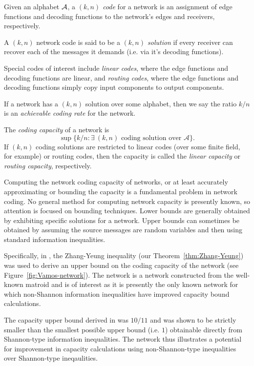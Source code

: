 \documentclass[10pt,journal]{IEEEtran}
\begin{document}
Given an alphabet $\mathcal{A}$,
a \textit{$(k,n)$ code}
for a network
is an assignment of edge functions and decoding functions
to the network's edges and receivers, respectively.
%

A $(k,n)$ network code is said to be a \textit{$(k,n)$ solution} if every receiver can recover
each of the messages it demands
(i.e. via it's decoding functions).

Special codes of interest include \textit{linear codes},
where the edge functions and decoding functions are linear,
and \textit{routing codes},
where the edge functions and decoding functions simply copy input components to output components.

If a network has a $(k,n)$ solution over some alphabet,
then we say the ratio $k/n$ is an \textit{achievable coding rate} for the network.

The
\textit{coding capacity} of a network
is
$$\sup \{ k/n : \exists\ (k,n) \mbox{ coding solution over } \mathcal{A} \}.$$
%
If $(k,n)$ coding solutions are restricted to linear codes
(over some finite field, for example) or routing codes,
then the capacity is called the \textit{linear capacity}
or \textit{routing capacity}, respectively.

Computing the network coding capacity of networks,
or at least accurately approximating or bounding the capacity
is a fundamental problem in network coding.
No general method for computing network capacity is presently known,
so attention is focused on bounding techniques.
Lower bounds are generally obtained by exhibiting specific solutions for a network.
Upper bounds can sometimes be obtained by assuming the source messages are random variables
and then using standard information inequalities.

Specifically, in \cite{Dougherty-Freiling-Zeger06-Matroids},
the Zhang-Yeung inequality
(our Theorem~\ref{thm:Zhang-Yeung})
was used to
derive an upper bound on the coding capacity of the \Vamos{} network
(see Figure~\ref{fig:Vamos-network}).
The \Vamos{} network is a
network constructed from the well-known \Vamos{} matroid
and is of interest
as it is presently the only known network for which non-Shannon
information inequalities have improved capacity bound calculations.

The capacity upper bound derived in \cite{Dougherty-Freiling-Zeger06-Matroids} was $10/11$
and was shown to be strictly smaller than the smallest possible upper bound
(i.e. $1$)
obtainable directly from Shannon-type information inequalities.
The \Vamos{} network thus illustrates a potential for improvement in capacity
calculations using non-Shannon-type inequalities over Shannon-type ineqaulities.
\end{document}
